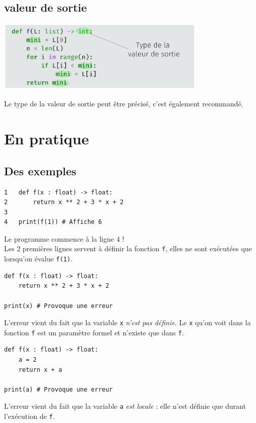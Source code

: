 \subsection{valeur de sortie}
\begin{center}
    \includegraphics[width=10cm]{img/anat3}
\end{center}
Le type de la valeur de sortie peut être précisé, c'est également recommandé.

\section{En pratique}
\subsection{Des exemples}
 \begin{pyc}
\begin{verbatim}
1   def f(x : float) -> float:
2       return x ** 2 + 3 * x + 2
3    
4   print(f(1)) # Affiche 6
\end{verbatim}
\end{pyc}
Le programme commence à la ligne 4 !\\
Les 2 premières lignes servent à définir la fonction \texttt{f}, elles ne sont exécutées que lorsqu'on évalue \texttt{f(1)}.\\



\begin{pyc}
\begin{verbatim}
def f(x : float) -> float:
    return x ** 2 + 3 * x + 2
    
print(x) # Provoque une erreur
\end{verbatim}
\end{pyc}
L'erreur vient du fait que la variable \texttt{x} \textit{n'est pas définie}. Le \og \texttt{x} qu'on voit dans la fonction \texttt{f}\fg{} est un paramètre formel et n'existe que dans \texttt{f}.\\


\begin{pyc}
\begin{verbatim}
def f(x : float) -> float:
    a = 2
    return x + a

print(a) # Provoque une erreur
    \end{verbatim}
\end{pyc}
L'erreur vient du fait que la variable \texttt{a} \textit{est locale} : elle n'est définie que durant l'exécution de \texttt{f}.\\

